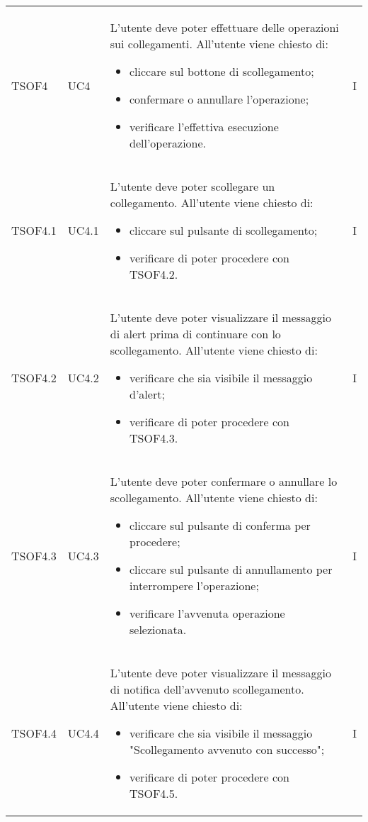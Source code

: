 \begin{longtable}{C{2.5cm} C{2.5cm} L{8cm} C{2cm}}

TSOF4 &
UC4 &
L'utente deve poter effettuare delle operazioni sui collegamenti. All'utente viene chiesto di:
\begin{itemize}
	\item cliccare sul bottone di scollegamento;
	\item confermare o annullare l'operazione;
	\item verificare l'effettiva esecuzione dell'operazione.
\end{itemize}&
I \\


TSOF4.1 &
UC4.1 &
L'utente deve poter scollegare un collegamento. All'utente viene chiesto di:
\begin{itemize}
	\item cliccare sul pulsante di scollegamento;
	\item verificare di poter procedere con TSOF4.2.
\end{itemize}&
I \\

TSOF4.2 &
UC4.2 &
L'utente deve poter visualizzare il messaggio di alert prima di continuare con lo scollegamento. All'utente viene chiesto di:
\begin{itemize}
	\item verificare che sia visibile il messaggio d'alert;
	\item verificare di poter procedere con TSOF4.3.
\end{itemize}&
I \\

TSOF4.3 &
UC4.3 &
L'utente deve poter confermare o annullare lo scollegamento. All'utente viene chiesto di:
\begin{itemize}
	\item cliccare sul pulsante di conferma per procedere;
	\item cliccare sul pulsante di annullamento per interrompere l'operazione;
	\item verificare l'avvenuta operazione selezionata.
\end{itemize}&
I \\

TSOF4.4 &
UC4.4 &
L'utente deve poter visualizzare il messaggio di notifica dell'avvenuto scollegamento. All'utente viene chiesto di:
\begin{itemize}
	\item verificare che sia visibile il messaggio "Scollegamento avvenuto con successo";
	\item verificare di poter procedere con TSOF4.5.
\end{itemize}&
I \\


\end{longtable}
